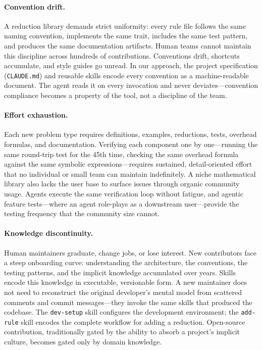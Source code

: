 \documentclass[conference]{IEEEtran}
\begin{document}
\paragraph{Convention drift.}
A reduction library demands strict uniformity: every rule file follows the same naming convention, implements the same trait, includes the same test pattern, and produces the same documentation artifacts.
Human teams cannot maintain this discipline across hundreds of contributions.
Conventions drift, shortcuts accumulate, and style guides go unread.
In our approach, the project specification (\texttt{CLAUDE.md}) and reusable skills encode every convention as a machine-readable document.
The agent reads it on every invocation and never deviates---convention compliance becomes a property of the tool, not a discipline of the team.

\paragraph{Effort exhaustion.}
Each new problem type requires definitions, examples, reductions, tests, overhead formulas, and documentation.
Verifying each component one by one---running the same round-trip test for the 45th time, checking the same overhead formula against the same symbolic expressions---requires sustained, detail-oriented effort that no individual or small team can maintain indefinitely.
A niche mathematical library also lacks the user base to surface issues through organic community usage.
Agents execute the same verification loop without fatigue, and agentic feature tests---where an agent role-plays as a downstream user---provide the testing frequency that the community size cannot.

\paragraph{Knowledge discontinuity.}
Human maintainers graduate, change jobs, or lose interest.
New contributors face a steep onboarding curve: understanding the architecture, the conventions, the testing patterns, and the implicit knowledge accumulated over years.
Skills encode this knowledge in executable, versionable form.
A new maintainer does not need to reconstruct the original developer's mental model from scattered comments and commit messages---they invoke the same skills that produced the codebase.
The \texttt{dev-setup} skill configures the development environment; the \texttt{add-rule} skill encodes the complete workflow for adding a reduction.
Open-source contribution, traditionally gated by the ability to absorb a project's implicit culture, becomes gated only by domain knowledge.
\end{document}
